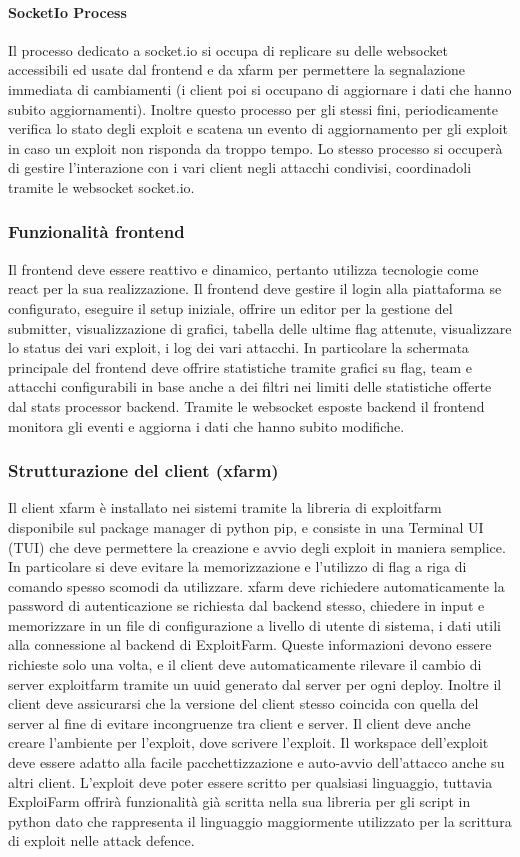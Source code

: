 \documentclass[11pt]{article}
\begin{document}
\paragraph{SocketIo Process}
Il processo dedicato a socket.io si occupa di replicare su delle websocket accessibili ed usate dal frontend e da xfarm per permettere la segnalazione immediata di cambiamenti (i client poi si occupano di aggiornare i dati che hanno subito aggiornamenti).
Inoltre questo processo per gli stessi fini, periodicamente verifica lo stato degli exploit e scatena un evento di aggiornamento per gli exploit in caso un exploit non risponda da troppo tempo. Lo stesso processo si occuperà di gestire l'interazione con i vari client negli attacchi condivisi, coordinadoli tramite le websocket socket.io.
\subsubsection{Funzionalità frontend}
Il frontend deve essere reattivo e dinamico, pertanto utilizza tecnologie come react per la sua realizzazione. Il frontend deve gestire il login alla piattaforma se configurato, eseguire il setup iniziale, offrire un editor per la gestione del submitter, visualizzazione di grafici, tabella delle ultime flag attenute, visualizzare lo status dei vari exploit, i log dei vari attacchi.
In particolare la schermata principale del frontend deve offrire statistiche tramite grafici su flag, team e attacchi configurabili in base anche a dei filtri nei limiti delle statistiche offerte dal stats processor backend.
Tramite le websocket esposte backend il frontend monitora gli eventi e aggiorna i dati che hanno subito modifiche.
\subsubsection{Strutturazione del client (xfarm)}
Il client xfarm è installato nei sistemi tramite la libreria di exploitfarm disponibile sul package manager di python pip, e consiste in una Terminal UI (TUI) che deve permettere la creazione e avvio degli exploit in maniera semplice. In particolare si deve evitare la memorizzazione e l'utilizzo di flag a riga di comando spesso scomodi da utilizzare. xfarm deve richiedere automaticamente la password di autenticazione se richiesta dal backend stesso, chiedere in input e memorizzare in un file di configurazione a livello di utente di sistema, i dati utili alla connessione al backend di ExploitFarm. Queste informazioni devono essere richieste solo una volta, e il client deve automaticamente rilevare il cambio di server exploitfarm tramite un uuid generato dal server per ogni deploy. Inoltre il client deve assicurarsi che la versione del client stesso coincida con quella del server al fine di evitare incongruenze tra client e server. Il client deve anche creare l'ambiente per l'exploit, dove scrivere l'exploit. Il workspace dell'exploit deve essere adatto alla facile pacchettizzazione e auto-avvio dell'attacco anche su altri client. L'exploit deve poter essere scritto per qualsiasi linguaggio, tuttavia ExploiFarm offrirà funzionalità già scritta nella sua libreria per gli script in python dato che rappresenta il linguaggio maggiormente utilizzato per la scrittura di exploit nelle attack defence.
\end{document}
